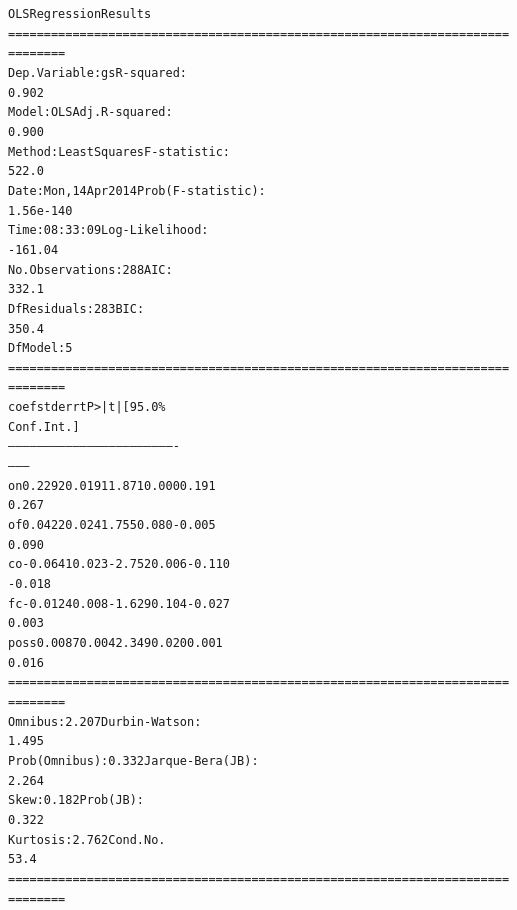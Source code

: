\documentclass[letterpaper,10pt,english]{/usr/local/lib/python2.7/dist-packages/sphinx/texinputs/sphinxhowto}
\newenvironment{InvisibleVerbatim}
        {\begin{mdframed}[leftmargin=0.1\linewidth,innerleftmargin=3pt,innerrightmargin=3pt, userdefinedwidth=1\linewidth, linewidth=0pt, linecolor=white, usetwoside=false]}
        {\end{mdframed}}
\begin{document}
    

        
        

            
                \begin{InvisibleVerbatim}
                \vspace{-0.5\baselineskip}
\begin{alltt}                            OLS Regression Results
======================================================================
========
Dep. Variable:                     gs   R-squared:
0.902
Model:                            OLS   Adj. R-squared:
0.900
Method:                 Least Squares   F-statistic:
522.0
Date:                Mon, 14 Apr 2014   Prob (F-statistic):
1.56e-140
Time:                        08:33:09   Log-Likelihood:
-161.04
No. Observations:                 288   AIC:
332.1
Df Residuals:                     283   BIC:
350.4
Df Model:                           5
======================================================================
========
                 coef    std err          t      P>|t|      [95.0\%
Conf. Int.]
----------------------------------------------------------------------
--------
on             0.2292      0.019     11.871      0.000         0.191
0.267
of             0.0422      0.024      1.755      0.080        -0.005
0.090
co            -0.0641      0.023     -2.752      0.006        -0.110
-0.018
fc            -0.0124      0.008     -1.629      0.104        -0.027
0.003
poss           0.0087      0.004      2.349      0.020         0.001
0.016
======================================================================
========
Omnibus:                        2.207   Durbin-Watson:
1.495
Prob(Omnibus):                  0.332   Jarque-Bera (JB):
2.264
Skew:                           0.182   Prob(JB):
0.322
Kurtosis:                       2.762   Cond. No.
53.4
======================================================================
========
\end{alltt}

            \end{InvisibleVerbatim}
            
        
    


\end{document}
